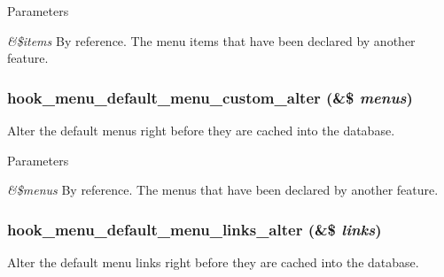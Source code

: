 \begin{DoxyParams}{Parameters}
\item[{\em \&\$items}]By reference. The menu items that have been declared by another feature. \end{DoxyParams}
\hypertarget{group__features__component__alter__hooks_gad81e139fd9584fcfbd5f9c1ece67e48b}{
\subsubsection[{hook\_\-menu\_\-default\_\-menu\_\-custom\_\-alter}]{\setlength{\rightskip}{0pt plus 5cm}hook\_\-menu\_\-default\_\-menu\_\-custom\_\-alter (\&\$ {\em menus})}}
\label{group__features__component__alter__hooks_gad81e139fd9584fcfbd5f9c1ece67e48b}
Alter the default menus right before they are cached into the database.


\begin{DoxyParams}{Parameters}
\item[{\em \&\$menus}]By reference. The menus that have been declared by another feature. \end{DoxyParams}
\hypertarget{group__features__component__alter__hooks_ga86626f45ed4bf19d0cc56db05a1c045e}{
\subsubsection[{hook\_\-menu\_\-default\_\-menu\_\-links\_\-alter}]{\setlength{\rightskip}{0pt plus 5cm}hook\_\-menu\_\-default\_\-menu\_\-links\_\-alter (\&\$ {\em links})}}
\label{group__features__component__alter__hooks_ga86626f45ed4bf19d0cc56db05a1c045e}
Alter the default menu links right before they are cached into the database.


